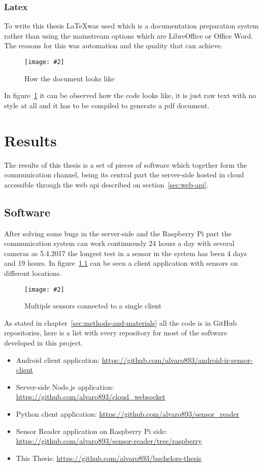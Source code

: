 \documentclass[hidelinks,11pt,a4paper,oneside,article]{memoir}
\newcommand{\putimage}[3][10] %
{
\begin{figure}[h]
	\centering
	\captionsetup{justification=centering}
	\texttt{[image: \#2]}
	\caption{#3}
	\label{fig:#2}
\end{figure}
}
\begin{document}
\subsection{Latex}
To write this thesis \LaTeX was used which is a documentation preparation system rather than using the mainstream options which are LibreOffice or Office Word. The reasons for this was automation and the quality that can achieve.

    \putimage{latex-look}{How the document looks like}
    
In figure~\ref{fig:latex-look} it can be observed how the code looks like, it is just raw text with no style at all and it has to be compiled to generate a \gls{pdf} document.

\clearpage\chapter{Results}\label{sec:results}
The results of this thesis is a set of pieces of software which together form the communication channel, being its central part the server-side hosted in cloud accessible through the web \gls{api} described on section~\ref{sec:web-api}.



\section{Software}\label{sec:software}
After solving some bugs in the server-side and the Raspberry Pi part the communication system can work continuously 24 hours a day with several cameras as 5.4.2017 the longest test in a sensor in the system has been 4 days and 19 hours. In figure~\ref{fig:multi-camera} can be seen a client application with sensors on different locations.

     \putimage{multi-camera}{Multiple sensors connected to a single client}

As stated in chapter~\ref{sec:methods-and-materials} all the code is in GitHub repositories, here is a list with every repository for most of the software developed in this project.


\begin{itemize}
    \item Android client application: \url{https://github.com/alvaro893/android-ir-sensor-client}
    \item Server-side Node.js application: \url{https://github.com/alvaro893/cloud_websocket}
    \item Python client application: \url{https://github.com/alvaro893/sensor_reader}
    \item Sensor Reader application on Raspberry Pi side: \url{https://github.com/alvaro893/sensor-reader/tree/raspberry}
    \item This Thesis: \url{https://github.com/alvaro893/bachelors-thesis}
\end{itemize}
\end{document}
